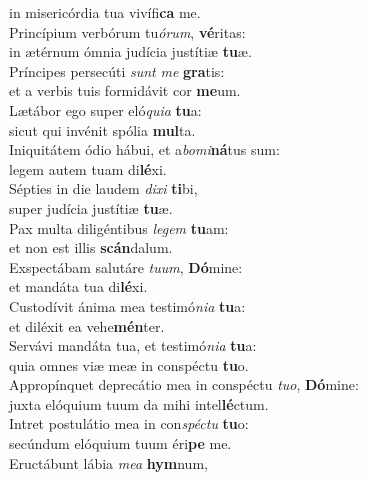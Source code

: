 \oddverse in misericórdia tua vivífi\textbf{ca} me.\\
\evenverse Princípium verbórum tu\textit{ó}\textit{rum}, \textbf{vé}ritas:~\*\\
\evenverse in ætérnum ómnia judícia justítiæ \textbf{tu}æ.\\
\oddverse Príncipes persecúti \textit{sunt} \textit{me} \textbf{gra}tis:~\*\\
\oddverse et a verbis tuis formidávit cor \textbf{me}um.\\
\evenverse Lætábor ego super eló\textit{qui}\textit{a} \textbf{tu}a:~\*\\
\evenverse sicut qui invénit spólia \textbf{mul}ta.\\
\oddverse Iniquitátem ódio hábui, et a\textit{bo}\textit{mi}\textbf{ná}tus sum:~\*\\
\oddverse legem autem tuam di\textbf{lé}xi.\\
\evenverse Sépties in die laudem \textit{di}\textit{xi} \textbf{ti}bi,~\*\\
\evenverse super judícia justítiæ \textbf{tu}æ.\\
\oddverse Pax multa diligéntibus \textit{le}\textit{gem} \textbf{tu}am:~\*\\
\oddverse et non est illis \textbf{scán}dalum.\\
\evenverse Exspectábam salutáre \textit{tu}\textit{um}, \textbf{Dó}mine:~\*\\
\evenverse et mandáta tua di\textbf{lé}xi.\\
\oddverse Custodívit ánima mea testimó\textit{ni}\textit{a} \textbf{tu}a:~\*\\
\oddverse et diléxit ea vehe\textbf{mén}ter.\\
\evenverse Servávi mandáta tua, et testimó\textit{ni}\textit{a} \textbf{tu}a:~\*\\
\evenverse quia omnes viæ meæ in conspéctu \textbf{tu}o.\\
\oddverse Appropínquet deprecátio mea in conspéctu \textit{tu}\textit{o}, \textbf{Dó}mine:~\*\\
\oddverse juxta elóquium tuum da mihi intel\textbf{lé}ctum.\\
\evenverse Intret postulátio mea in con\textit{spé}\textit{ctu} \textbf{tu}o:~\*\\
\evenverse secúndum elóquium tuum éri\textbf{pe} me.\\
\oddverse Eructábunt lábia \textit{me}\textit{a} \textbf{hym}num,~\*\\
